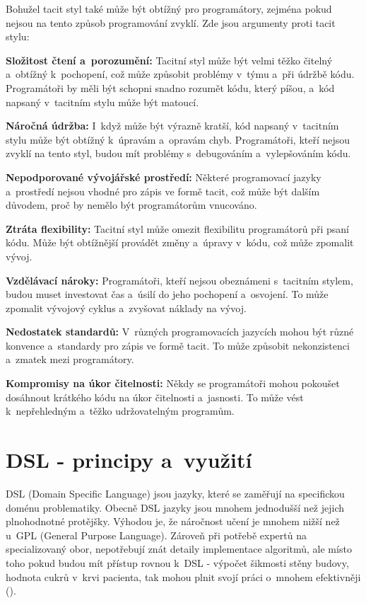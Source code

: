 \documentclass[male, czech]{kithesis}
\begin{document}
Bohužel tacit styl také může být obtížný pro programátory, 
zejména pokud nejsou na tento způsob programování zvyklí. 
Zde jsou argumenty proti tacit stylu:

\textbf{Složitost čtení a~porozumění:} 
Tacitní styl může být velmi těžko čitelný a~obtížný k~pochopení, 
což může způsobit problémy v~týmu a~při údržbě kódu. 
Programátoři by měli být schopni snadno rozumět kódu,
který píšou, a~kód napsaný v~tacitním stylu může být matoucí.

\textbf{Náročná údržba:}
I~když může být výrazně kratší, 
kód napsaný v~tacitním stylu může být obtížný k~úpravám a~opravám chyb. 
Programátoři, kteří nejsou zvyklí na tento styl, 
budou mít problémy s~debugováním a~vylepšováním kódu.

\textbf{Nepodporované vývojářské prostředí:}
Některé programovací jazyky
a~prostředí nejsou vhodné pro zápis ve formě tacit, 
což může být dalším důvodem, 
proč by nemělo být programátorům vnucováno.

\textbf{Ztráta flexibility:}
Tacitní styl může omezit flexibilitu programátorů při psaní kódu.
Může být obtížnější provádět změny
a~úpravy v~kódu, což může zpomalit vývoj.

\textbf{Vzdělávací nároky:}
Programátoři, 
kteří nejsou obeznámeni s~tacitním stylem, 
budou muset investovat čas a~úsilí do jeho pochopení a~osvojení. 
To může zpomalit vývojový cyklus a~zvyšovat náklady na vývoj.

\textbf{Nedostatek standardů:}
V~různých programovacích jazycích mohou být různé konvence
a~standardy pro zápis ve formě tacit. 
To může způsobit nekonzistenci a~zmatek mezi programátory.

\textbf{Kompromisy na úkor čitelnosti:}
Někdy se programátoři mohou pokoušet dosáhnout krátkého kódu na úkor čitelnosti a~jasnosti. 
To může vést k~nepřehledným a~těžko udržovatelným programům.

\chapter{DSL - principy a~využití}
DSL (Domain Specific Language) jsou jazyky, 
které se zaměřují na specifickou doménu problematiky.
Obecně DSL jazyky jsou mnohem jednodušší než jejich plnohodnotné protějšky. 
Výhodou je, 
že náročnost učení je mnohem nižší než u~GPL (General Purpose Language). 
Zároveň při potřebě expertů na specializovaný obor, 
nepotřebují znát detaily implementace algoritmů, 
ale místo toho pokud budou mít přístup rovnou k~DSL - výpočet šikmosti stěny budovy,
hodnota cukrů v~krvi pacienta, 
tak mohou plnit svojí práci o~mnohem efektivněji (\cite{DomainSpecificLanguages}).
\end{document}
